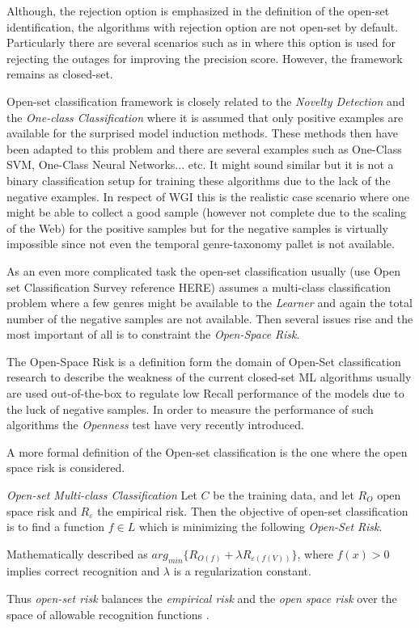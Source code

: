 Although, the rejection option is emphasized in the definition of the open-set identification, the algorithms with rejection option are not open-set by default. Particularly there are several scenarios such as in \parencite{onan2018ensemble} where this option is used for rejecting the outages for improving the precision score. However, the framework remains as closed-set.

Open-set classification framework is closely related to the \textit{Novelty Detection} and the \textit{One-class Classification} where it is assumed that only positive examples are available for the surprised model induction methods. These methods then have been adapted to this problem and there are several examples such as One-Class SVM, One-Class Neural Networks... etc. It might sound similar but it is not a binary classification setup for training these algorithms due to the lack of the negative examples. In respect of WGI this is the realistic case scenario where one might be able to collect a good sample (however not complete due to the scaling of the Web) for the positive samples but for the negative samples is virtually impossible since not even the temporal genre-taxonomy pallet is not available. 

As an even more complicated task the open-set classification usually (use Open set Classification Survey reference HERE) assumes a multi-class classification problem where a few genres might be available to the \textit{Learner} and again the total number of the negative samples are not available. Then several issues rise and the most important of all is to constraint the \textit{Open-Space Risk}.

The {Open-Space Risk} is a definition form the domain of Open-Set classification research to describe the weakness of the current closed-set ML algorithms usually are used out-of-the-box to regulate low Recall performance of the models due to the luck of negative samples. In order to measure the performance of such algorithms the \textit{Openness} test have very recently introduced. 

A more formal definition of the Open-set classification is the one where the open space risk is considered.

\theoremstyle{definition}
\begin{definition}{\textit{Open-set Multi-class Classification}}
Let $C$ be the training data, and let $R_{O}$ open space risk and $R_{ε}$ the empirical risk. Then the objective of open-set classification is to find a function $f \in L$ which is minimizing the following \textit{Open-Set Risk}. 

Mathematically described as $arg_{min} \{R_{O(f )} + \lambda R_{ε (f (V ))}\}$, where $f (x) > 0$ implies correct recognition and $\lambda$ is a regularization constant.

Thus \textit{open-set risk} balances the \textit{empirical risk} and the \textit{open space risk} over the space of allowable recognition functions \parencite{geng2018recent}.
\end{definition}


